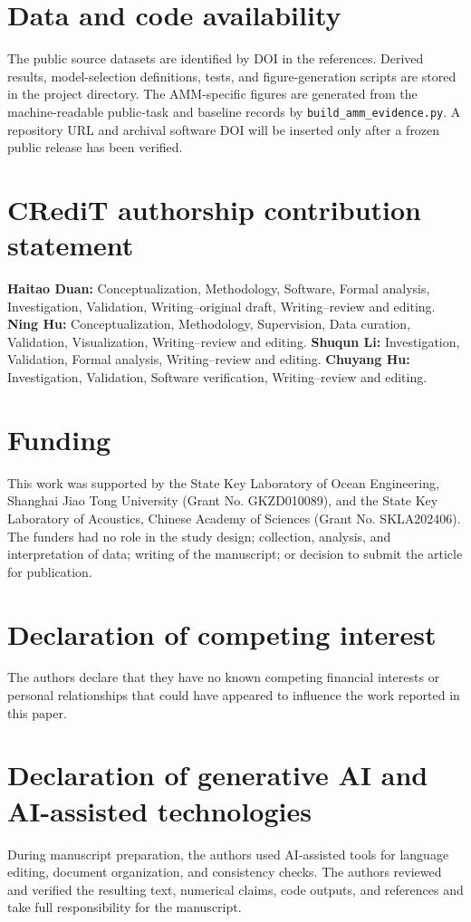 \documentclass[11pt]{article}
\begin{document}
\section*{Data and code availability}
The public source datasets are identified by DOI in the references. Derived results, model-selection definitions, tests, and figure-generation scripts are stored in the project directory. The AMM-specific figures are generated from the machine-readable public-task and baseline records by \texttt{build\_amm\_evidence.py}. A repository URL and archival software DOI will be inserted only after a frozen public release has been verified.

\section*{CRediT authorship contribution statement}
\textbf{Haitao Duan:} Conceptualization, Methodology, Software, Formal analysis, Investigation, Validation, Writing--original draft, Writing--review and editing. \textbf{Ning Hu:} Conceptualization, Methodology, Supervision, Data curation, Validation, Visualization, Writing--review and editing. \textbf{Shuqun Li:} Investigation, Validation, Formal analysis, Writing--review and editing. \textbf{Chuyang Hu:} Investigation, Validation, Software verification, Writing--review and editing.

\section*{Funding}
This work was supported by the State Key Laboratory of Ocean Engineering, Shanghai Jiao Tong University (Grant No. GKZD010089), and the State Key Laboratory of Acoustics, Chinese Academy of Sciences (Grant No. SKLA202406). The funders had no role in the study design; collection, analysis, and interpretation of data; writing of the manuscript; or decision to submit the article for publication.

\section*{Declaration of competing interest}
The authors declare that they have no known competing financial interests or personal relationships that could have appeared to influence the work reported in this paper.

\section*{Declaration of generative AI and AI-assisted technologies}
During manuscript preparation, the authors used AI-assisted tools for language editing, document organization, and consistency checks. The authors reviewed and verified the resulting text, numerical claims, code outputs, and references and take full responsibility for the manuscript.
\end{document}

